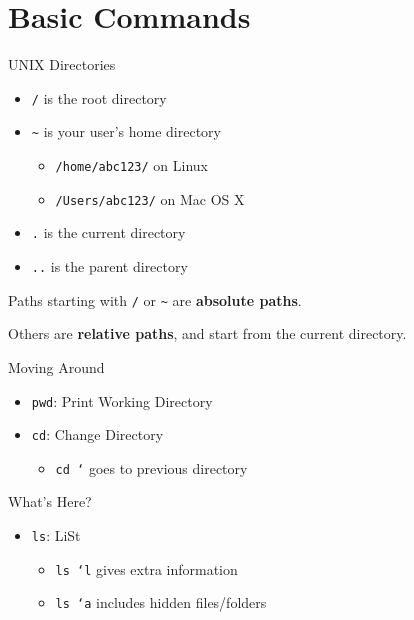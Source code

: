 \documentclass[pdf,usenames,dvipsnames,14pt]{beamer}%
\newcommand\hyphen{\char`\-}
\renewcommand\emph[1]{\textbf{#1}}
\begin{document}
\section{Basic Commands}

\begin{frame}{UNIX Directories}
	\begin{itemize}
		\item \texttt{/} is the root directory
		\item \texttt{\textasciitilde} is your user's home directory
		\begin{itemize}
			\item \texttt{/home/abc123/} on Linux
			\item \texttt{/Users/abc123/} on Mac OS X
		\end{itemize}
		\item \texttt{.} is the current directory
		\item \texttt{..} is the parent directory
	\end{itemize}
	Paths starting with \texttt{/} or \texttt{\textasciitilde} are \emph{absolute paths}.
	
	Others are \emph{relative paths}, and start from the current directory.
\end{frame}

\begin{frame}{Moving Around}
	\begin{itemize}
		\item \texttt{pwd}: Print Working Directory
		\item \texttt{cd}: Change Directory
		\begin{itemize}
			\item \texttt{cd \hyphen} goes to previous directory
		\end{itemize}
	\end{itemize}
\end{frame}

\begin{frame}{What's Here?}
	\begin{itemize}
		\item \texttt{ls}: LiSt
		\begin{itemize}
			\item \texttt{ls \hyphen l} gives extra information
			\item \texttt{ls \hyphen a} includes hidden files/folders
		\end{itemize}
	\end{itemize}
\end{frame}
\end{document}
